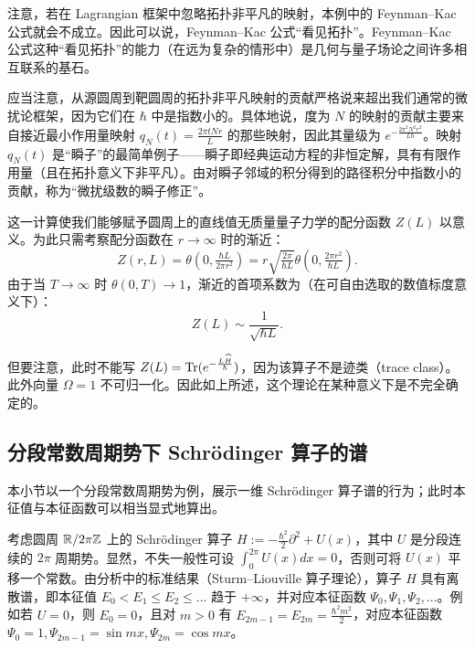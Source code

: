 注意，若在 Lagrangian 框架中忽略拓扑非平凡的映射，本例中的 Feynman–Kac 公式就会不成立。因此可以说，Feynman–Kac 公式“看见拓扑”。Feynman–Kac 公式这种“看见拓扑”的能力（在远为复杂的情形中）是几何与量子场论之间许多相互联系的基石。

\begin{remark} 应当注意，从源圆周到靶圆周的拓扑非平凡映射的贡献严格说来超出我们通常的微扰论框架，因为它们在 $\hbar$ 中是指数小的。具体地说，度为 $N$ 的映射的贡献主要来自接近最小作用量映射 $q_N(t)=\frac{2\pi tNr}{L}$ 的那些映射，因此其量级为 $e^{-\frac{2\pi^2N^2r^2}{L\hbar}}$。映射 $q_N(t)$ 是“瞬子”的最简单例子——瞬子即经典运动方程的非恒定解，具有有限作用量（且在拓扑意义下非平凡）。由对瞬子邻域的积分得到的路径积分中指数小的贡献，称为“微扰级数的瞬子修正”。
\end{remark} 


\begin{remark}\label{givesen} 
这一计算使我们能够赋予圆周上的直线值无质量量子力学的配分函数 $Z(L)$ 以意义。为此只需考察配分函数在 $r\to \infty$ 时的渐近：
$$
Z(r,L)=\theta(0,\tfrac{\hbar L}{2\pi r^2})=r\sqrt{\tfrac{2\pi}{\hbar L}}\theta(0,\tfrac{2\pi r^2}{\hbar L}). 
$$
由于当 $T\to \infty$ 时 $\theta(0,T)\to 1$，渐近的首项系数为（在可自由选取的数值标度意义下）：
$$
Z(L)\sim \frac{1}{\sqrt{\hbar L}}. 
$$

但要注意，此时不能写 $Z(L)={\rm Tr}(e^{-\frac{L\widehat H}{\hbar}})$，因为该算子不是迹类（trace class）。此外向量 $\Omega=1$ 不可归一化。因此如上所述，这个理论在某种意义下是不完全确定的。
\end{remark} 

\subsection{分段常数周期势下 Schrödinger 算子的谱}

本小节以一个分段常数周期势为例，展示一维 Schrödinger 算子谱的行为；此时本征值与本征函数可以相当显式地算出。

考虑圆周 $\Bbb R/2\pi \Bbb Z$ 上的 Schrödinger 算子
$H:=-\frac{\hbar^2}{2}\partial^2+U(x)$，其中 $U$ 是分段连续的
$2\pi$ 周期势。显然，不失一般性可设 $\int_0^{2\pi}U(x)dx=0$，否则可将 $U(x)$ 平移一个常数。由分析中的标准结果（Sturm–Liouville 算子理论），算子 $H$ 具有离散谱，即本征值 $E_0<E_1\le E_2\le...$ 趋于 $+\infty$，并对应本征函数 $\Psi_0,\Psi_1,\Psi_2,...$。例如若
$U=0$，则 $E_0=0$，且对 $m>0$ 有 $E_{2m-1}=E_{2m}=\frac{\hbar^2 m^2}{2}$，对应本征函数 $\Psi_0=1, \Psi_{2m-1}=\sin mx, \Psi_{2m}=\cos mx$。

